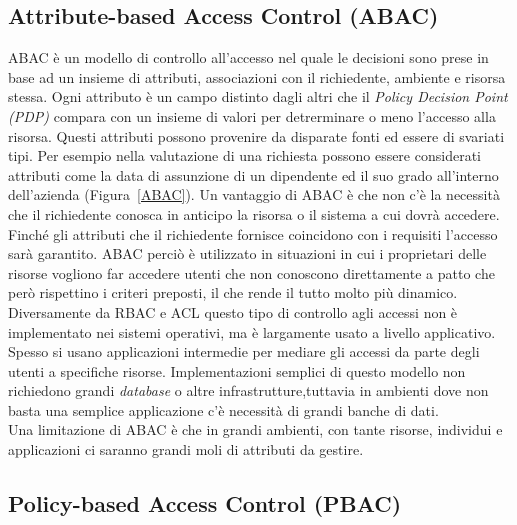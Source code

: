 \subsection*{Attribute-based Access Control (ABAC)} %
\label{sub:attribute_based_access_control_}

ABAC è un modello di controllo all'accesso  nel quale le decisioni sono prese in base ad un insieme 
di attributi, associazioni con il richiedente, ambiente e risorsa stessa.
Ogni attributo è un campo distinto dagli altri che il \textit{Policy Decision Point (PDP)} compara con un insieme di valori per detrerminare o meno l'accesso alla risorsa.
Questi attributi possono provenire da disparate fonti ed essere di svariati tipi. Per esempio nella valutazione di una richiesta possono essere considerati attributi come la data di assunzione di un dipendente ed il suo grado all'interno dell'azienda (Figura~\ref{ABAC}). 
Un vantaggio di ABAC è che non c'è la necessità che il richiedente conosca in anticipo
la risorsa o il sistema a cui dovrà accedere. Finché gli attributi che il richiedente fornisce 
coincidono con i requisiti l'accesso sarà garantito. ABAC perciò è utilizzato in situazioni in 
cui i proprietari delle risorse vogliono far accedere utenti che non conoscono direttamente a patto che però rispettino i criteri preposti, il che rende il tutto molto più dinamico.\\
Diversamente da RBAC e ACL questo tipo di controllo agli 
accessi non è implementato nei sistemi operativi, ma è largamente usato a livello applicativo.
Spesso si usano applicazioni intermedie per mediare gli accessi da parte degli utenti a specifiche risorse.
Implementazioni semplici di questo modello non richiedono grandi \textit{database} o altre infrastrutture,tuttavia in ambienti dove non basta una semplice applicazione c'è necessità di grandi banche di dati.\\
Una limitazione di ABAC è che in grandi ambienti, con tante risorse, individui e applicazioni ci saranno grandi moli di attributi da gestire.


\subsection*{Policy-based Access Control (PBAC)} %
\label{sub:policy_based_access_control_}

